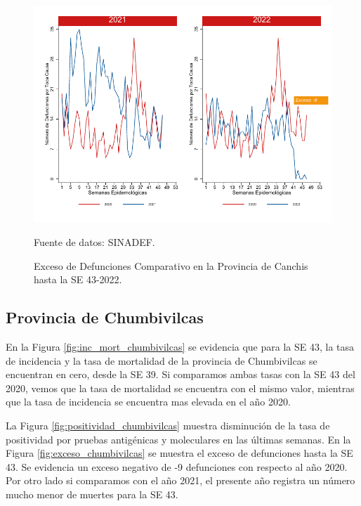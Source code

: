 \documentclass[12pt,a4paper,openany]{book}
\begin{document}
	\begin{figure}[h]
		\caption{Exceso de Defunciones Comparativo en la Provincia de Canchis hasta la SE 43-2022.}\label{fig:exceso_canchis}
		\begin{center}
			\includegraphics[width=0.7\linewidth]{../figuras/exceso_5.pdf}
		\end{center}
		{\footnotesize {Fuente de datos: SINADEF.}}
	\end{figure}
	
	\clearpage
	
	\subsection*{Provincia de Chumbivilcas}
	\noindent En la Figura \ref{fig:inc_mort_chumbivilcas} se evidencia que para la SE 43, la tasa de incidencia y la tasa de mortalidad de la provincia de Chumbivilcas se encuentran en cero, desde la SE 39. Si comparamos ambas tasas con la SE 43 del 2020, vemos que la tasa de mortalidad se encuentra con el mismo valor, mientras que la tasa de incidencia se encuentra mas elevada en el año 2020.
	
	\noindent La Figura \ref{fig:positividad_chumbivilcas} muestra disminución de la tasa de positividad por pruebas antigénicas y moleculares en las últimas semanas. 
	En la Figura \ref{fig:exceso_chumbivilcas} se muestra el exceso de defunciones hasta la SE 43. Se evidencia un exceso negativo de -9 defunciones con respecto al año 2020. Por otro lado si comparamos con el año 2021, el presente año registra un número mucho menor de muertes para la SE 43.
	
\end{document}
